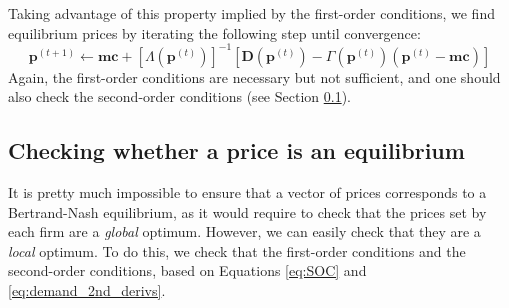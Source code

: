 \documentclass[12pt]{article}
\begin{document}
Taking advantage of this property implied by the first-order conditions, we find equilibrium prices by iterating the following step until convergence:
\begin{equation}
	\textbf{p}^{(t+1)} \leftarrow \textbf{mc} + \left[ \Lambda \left(\textbf{p}^{(t)} \right) \right]^{-1} \left[ \textbf{D}\left(\textbf{p}^{(t)} \right) - \Gamma\left(\textbf{p}^{(t)}\right) \left( \textbf{p}^{(t)} - \textbf{mc} \right) \right]
\end{equation}
Again, the first-order conditions are necessary but not sufficient, and one should also check the second-order conditions (see Section \ref{ssec:check_price_eq}).

\subsection{Checking whether a price is an equilibrium}\label{ssec:check_price_eq}
It is pretty much impossible to ensure that a vector of prices corresponds to a Bertrand-Nash equilibrium, as it would require to check that the prices set by each firm are a \textit{global} optimum. However, we can easily check that they are a \textit{local} optimum. To do this, we check that the first-order conditions and the second-order conditions, based on Equations \ref{eq:SOC} and \ref{eq:demand_2nd_derivs}.
\end{document}
